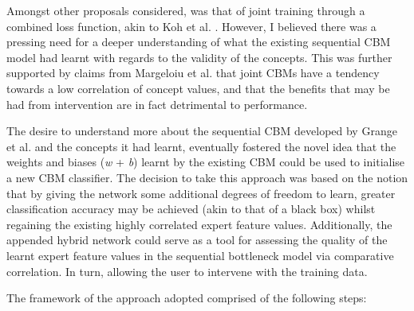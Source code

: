 Amongst other proposals considered, was that of joint training through a combined loss function, akin to Koh et al. \cite{kohConceptBottleneckModels2020}. However, I believed there was a pressing need for a deeper understanding of what the existing sequential CBM model had learnt with regards to the validity of the concepts. This was further supported by claims from Margeloiu et al. \cite{margeloiuConceptBottleneckModels2021}  that joint CBMs have a tendency towards a low correlation of concept values, and that the benefits that may be had from intervention are in fact detrimental to performance.

The desire to understand more about the sequential CBM developed by Grange et al. and the concepts it had learnt, eventually fostered the novel idea that the weights and biases (\emph{w} + \emph{b}) learnt by the existing CBM \cite{grangeXAISelfexplanatoryAI2022} could be used to initialise a new CBM classifier. The decision to take this approach was based on the notion that by giving the network some additional degrees of freedom to learn, greater classification accuracy may be achieved (akin to that of a black box) whilst regaining the existing highly correlated expert feature values. Additionally, the appended hybrid network could serve as a tool for assessing the quality of the learnt expert feature values in the sequential bottleneck model via comparative correlation. In turn, allowing the user to intervene with the training data.

The framework of the approach adopted comprised of the following steps: 

